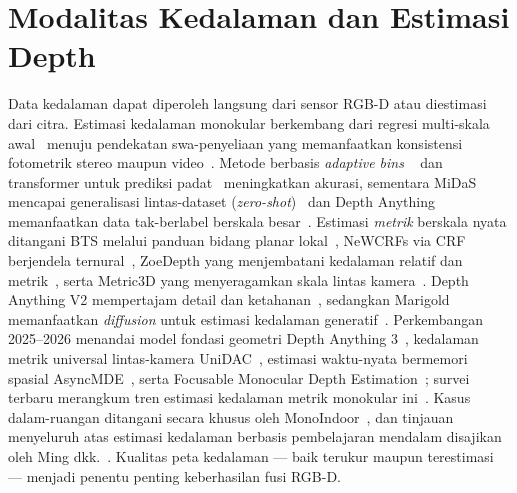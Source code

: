 \documentclass[11pt,a4paper]{article}
\begin{document}
\section{Modalitas Kedalaman dan Estimasi Depth}
Data kedalaman dapat diperoleh langsung dari sensor RGB-D atau diestimasi dari
citra. Estimasi kedalaman monokular berkembang dari regresi multi-skala
awal~\cite{eigen2014depth} menuju pendekatan swa-penyeliaan yang memanfaatkan
konsistensi fotometrik stereo maupun video~\cite{godard2017monodepth,
godard2019monodepth2,guizilini2020packnet}. Metode berbasis \emph{adaptive bins}
~\cite{bhat2021adabins} dan transformer untuk prediksi
padat~\cite{ranftl2021dpt} meningkatkan akurasi, sementara MiDaS mencapai
generalisasi lintas-dataset (\emph{zero-shot})~\cite{ranftl2022midas} dan Depth
Anything memanfaatkan data tak-berlabel berskala besar~\cite{yang2024depthanything}.
Estimasi \emph{metrik} berskala nyata ditangani BTS melalui panduan bidang planar
lokal~\cite{lee2019bts}, NeWCRFs via CRF berjendela ternural~\cite{yuan2022newcrfs},
ZoeDepth yang menjembatani kedalaman relatif dan metrik~\cite{bhat2023zoedepth},
serta Metric3D yang menyeragamkan skala lintas kamera~\cite{yin2023metric3d}. Depth
Anything V2 mempertajam detail dan ketahanan~\cite{yang2024depthanythingv2},
sedangkan Marigold memanfaatkan \emph{diffusion} untuk estimasi kedalaman
generatif~\cite{ke2024marigold}. Perkembangan 2025--2026 menandai model fondasi
geometri Depth Anything 3~\cite{lin2025depthanything3}, kedalaman metrik universal
lintas-kamera UniDAC~\cite{ganesan2026unidac}, estimasi waktu-nyata bermemori
spasial AsyncMDE~\cite{ma2026asyncmde}, serta Focusable Monocular Depth
Estimation~\cite{du2026focusabledepth}; survei terbaru merangkum tren estimasi
kedalaman metrik monokular ini~\cite{zhang2025metricdepthsurvey}.
Kasus dalam-ruangan ditangani secara khusus oleh
MonoIndoor~\cite{ji2021monoindoor}, dan tinjauan menyeluruh atas estimasi
kedalaman berbasis pembelajaran mendalam disajikan oleh Ming
dkk.~\cite{ming2021depthsurvey}. Kualitas peta kedalaman --- baik terukur
maupun terestimasi --- menjadi penentu penting keberhasilan fusi RGB-D.

\end{document}

